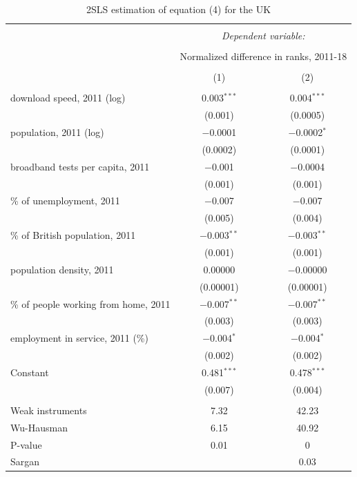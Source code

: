 \documentclass[10pt,letterpaper]{article}
\begin{document}
\begin{table}[!htbp] \centering 
  \caption{2SLS estimation of equation (4) for the UK\label{2sls.uk}} 
  \label{} 
\small 
\begin{tabular}{@{\extracolsep{5pt}}lcc} 
\\[-1.8ex]\hline 
\hline \\[-1.8ex] 
 & \multicolumn{2}{c}{\textit{Dependent variable:}} \\ 
\cline{2-3} 
\\[-1.8ex] & \multicolumn{2}{c}{Normalized difference in ranks, 2011-18} \\ 
\\[-1.8ex] & (1) & (2)\\ 
\hline \\[-1.8ex] 
 download speed, 2011 (log) & 0.003$^{***}$ & 0.004$^{***}$ \\ 
  & (0.001) & (0.0005) \\ 
  population, 2011 (log) & $-$0.0001 & $-$0.0002$^{*}$ \\ 
  & (0.0002) & (0.0001) \\ 
  broadband tests per capita, 2011 & $-$0.001 & $-$0.0004 \\ 
  & (0.001) & (0.001) \\ 
  \% of unemployment, 2011 & $-$0.007 & $-$0.007 \\ 
  & (0.005) & (0.004) \\ 
  \% of British population, 2011 & $-$0.003$^{**}$ & $-$0.003$^{**}$ \\ 
  & (0.001) & (0.001) \\ 
  population density, 2011 & 0.00000 & $-$0.00000 \\ 
  & (0.00001) & (0.00001) \\ 
  \% of people working from home, 2011 & $-$0.007$^{**}$ & $-$0.007$^{**}$ \\ 
  & (0.003) & (0.003) \\ 
  employment in service, 2011 (\%) & $-$0.004$^{*}$ & $-$0.004$^{*}$ \\ 
  & (0.002) & (0.002) \\ 
  Constant & 0.481$^{***}$ & 0.478$^{***}$ \\ 
  & (0.007) & (0.004) \\ 
 \hline \\[-1.8ex] 
Weak instruments & 7.32 & 42.23 \\ 
Wu-Hausman & 6.15 & 40.92 \\ 
P-value & 0.01 & 0 \\ 
Sargan &  & 0.03 \\ 

\end{tabular}
\end{table}
\end{document}
